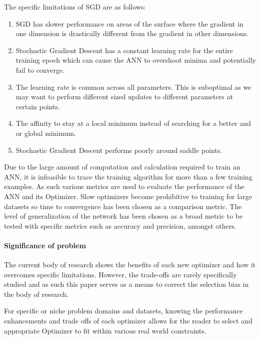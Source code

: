 \documentclass{article}
\begin{document}
	The specific limitations of SGD are as follows:
	\begin{enumerate}
		\item SGD has slower performance on areas of the surface where the gradient in one dimension is drastically different from the gradient in other dimensions.
		
		\item Stochastic Gradient Descent has a constant learning rate for the entire training epoch which can cause the ANN to overshoot minima and potentially fail to converge.
		
		\item The learning rate is common across all parameters. This is suboptimal as we may want to perform different sized updates to different parameters at certain points.
		
		\item The affinity to stay at a local minimum instead of searching for a better and or global minimum.
		
		\item Stochastic Gradient Descent performs poorly around saddle points.
	\end{enumerate}


	Due to the large amount of computation and calculation required to train an ANN, it is infeasible to trace the training algorithm for more than a few training examples. As such various metrics are used to evaluate the performance of the ANN and its Optimizer. Slow optimizers become prohibitive to training for large datasets so time to convergence has been chosen as a comparison metric. The level of generalization of the network has been chosen as a broad metric to be tested with specific metrics such as accuracy and precision, amongst others. 
	
	\paragraph{Significance of problem}
	The current body of research shows the benefits of each new optimizer and how it overcomes specific limitations. However, the trade-offs are rarely specifically studied and as such this paper serves as a means to correct the selection bias in the body of research. 
	
	For specific or niche problem domains and datasets, knowing the performance enhancements and trade offs of each optimizer allows for the reader to select and appropriate Optimizer to fit within various real world constraints.
	
\end{document}
